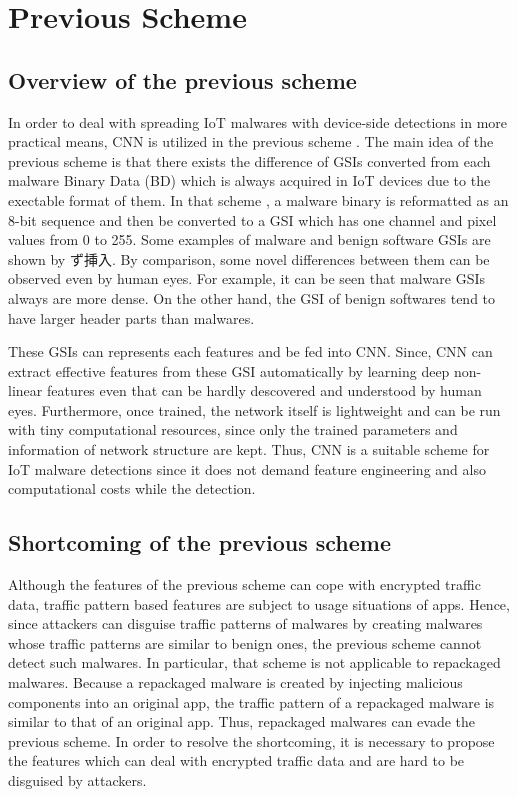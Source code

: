 \chapter{Previous Scheme}\label{sec:previous_scheme}
\section{Overview of the previous scheme} 
In order to deal with spreading IoT malwares with device-side detections in more practical means, CNN is utilized in the previous scheme \cite{previous}.
The main idea of the previous scheme is that there exists the difference of GSIs converted from each malware Binary Data (BD) which is always acquired in IoT devices due to the exectable format of them.
In that scheme \cite{previous}, a malware binary is reformatted as an 8-bit sequence and then be converted to a GSI which has one channel and pixel values from 0 to 255.
Some examples of malware and benign software GSIs are shown by ず挿入.
By comparison, some novel differences between them can be observed even by human eyes.
For example, it can be seen that malware GSIs always are more dense.
On the other hand, the GSI of benign softwares tend to have larger header parts than malwares.

These GSIs can represents each features and be fed into CNN.
Since, CNN can extract effective features from these GSI automatically by learning deep non-linear features even that can be hardly descovered and understood by human eyes.
Furthermore, once trained, the network itself is lightweight and can be run with tiny computational resources, since only the trained parameters and information of network structure are kept.
Thus, CNN is a suitable scheme for IoT malware detections since it does not demand feature engineering and also computational costs while the detection.

\section{Shortcoming of the previous scheme } 
Although the features of the previous scheme can cope with encrypted traffic data, traffic pattern based features are subject to usage situations of apps.
Hence, since attackers can disguise traffic patterns of malwares by creating malwares whose traffic patterns are similar to benign ones, the previous scheme cannot detect such malwares.
In particular, that scheme is not applicable to repackaged malwares. 
Because a repackaged malware is created by injecting malicious components into an original app, the traffic pattern of a repackaged malware is similar to that of an original app.
Thus, repackaged malwares can evade the previous scheme.
In order to resolve the shortcoming, it is necessary to propose the features which can deal with encrypted traffic data and are hard to be disguised by attackers.  
